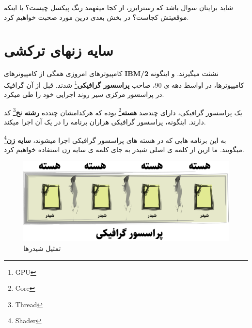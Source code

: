 \documentclass[14pt,a4paper]{memoir}
\begin{document}
	 
	 شاید برایتان سوال باشد که رسترایزر، از کجا میفهمد رنگ پیکسل چیست؟ یا اینکه موقعیتش کجاست؟ در بخش بعدی درین مورد صحبت خواهیم کرد.
	 
	 
	 
	 
	 
\section{سایه زنهای ترکشی}\label{frag}

	 
	 
	 کامپیوترهای امروزی همگی از کامپیوترهای \textbf{IBM/2} نشئت میگیرند. و اینگونه کامپیوترها، در اواسط دهه ی 90، صاحب \textbf{پراسسور گرافیکی}\footnote{GPU} شدند. قبل از آن گرافیک در پراسسور مرکزی سیر روند اجرایی خود را طی میکرد. 
	 
	 
	 یک پراسسور گرافیکی، دارای چندصد \textbf{هسته}\footnote{Core} بوده که هرکدامشان چندده \textbf{رشته نخ}\footnote{Thread} کد دارند. اینگونه، پراسسور گرافیکی هزاران برنامه را در یک آن اجرا میکند.
	 
	 به این برنامه هایی که در هسته های پراسسور گرافیکی اجرا میشوند، \textbf{سایه زن}\footnote{Shader} میگویند. ما ازین از کلمه ی اصلی شیدر به جای کلمه ی سایه زن استفاده خواهیم کرد.
	 
	 
	 
	 \begin{figure}
	 	\centering
	 	\includegraphics[scale=0.6]{Shaders}
	 	\caption{تمثیل شیدرها}
	 \end{figure}
	 
	 
	 
	 
	 
	 
	 
	 
	 
	 
	 
	 
	 
	 
	 
	 
	 
	 
	 
	 
	 
	 
	 
	 
	 
	 
	 
	 
	 
	 
	 
	 
	 
\end{document}
